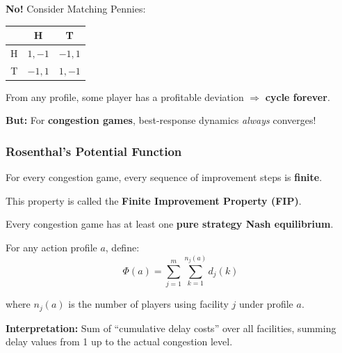 \begin{defbox}
\textbf{No!} Consider Matching Pennies:
\begin{center}
\renewcommand{\arraystretch}{1.2}
\begin{tabular}{@{} c | c c @{}}
 & H & T \\
\midrule
H & $1, -1$ & $-1, 1$ \\
T & $-1, 1$ & $1, -1$ \\
\end{tabular}
\end{center}

From any profile, some player has a profitable deviation $\Rightarrow$ \textbf{cycle forever}.

\textbf{But:} For \textbf{congestion games}, best-response dynamics \textit{always} converges!
\end{defbox}

\bigseparator

\subsubsection{Rosenthal's Potential Function}

\begin{thmbox}
For every congestion game, every sequence of improvement steps is \textbf{finite}.

This property is called the \textbf{Finite Improvement Property (FIP)}.
\end{thmbox}

\begin{defbox}[Corollary]
Every congestion game has at least one \textbf{pure strategy Nash equilibrium}.
\end{defbox}

\begin{defbox}
For any action profile $a$, define:
\[
\boxed{\Phi(a) = \sum_{j=1}^{m} \sum_{k=1}^{n_j(a)} d_j(k)}
\]

where $n_j(a)$ is the number of players using facility $j$ under profile $a$.

\textbf{Interpretation:} Sum of ``cumulative delay costs'' over all facilities, summing delay values from 1 up to the actual congestion level.
\end{defbox}

